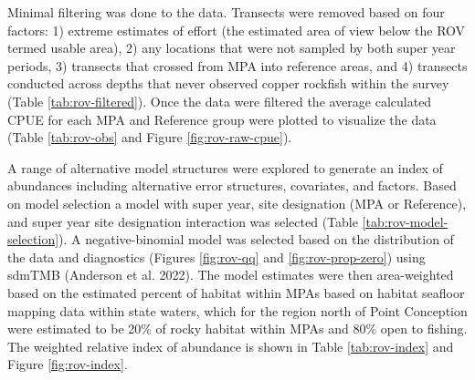 \documentclass[11pt,
  english,
  letterpaper,
]{article}
\begin{document}
Minimal filtering was done to the data. Transects were removed based on four factors: 1) extreme estimates of effort (the estimated area of view below the ROV termed usable area), 2) any locations that were not sampled by both super year periods, 3) transects that crossed from MPA into reference areas, and 4) transects conducted across depths that never observed copper rockfish within the survey (Table \ref{tab:rov-filtered}). Once the data were filtered the average calculated CPUE for each MPA and Reference group were plotted to visualize the data (Table \ref{tab:rov-obs} and Figure \ref{fig:rov-raw-cpue}).

A range of alternative model structures were explored to generate an index of abundances including alternative error structures, covariates, and factors. Based on model selection a model with super year, site designation (MPA or Reference), and super year site designation interaction was selected (Table \ref{tab:rov-model-selection}). A negative-binomial model was selected based on the distribution of the data and diagnostics (Figures \ref{fig:rov-qq} and \ref{fig:rov-prop-zero}) using sdmTMB (Anderson et al. 2022). The model estimates were then area-weighted based on the estimated percent of habitat within MPAs based on habitat seafloor mapping data within state waters, which for the region north of Point Conception were estimated to be 20\% of rocky habitat within MPAs and 80\% open to fishing. The weighted relative index of abundance is shown in Table \ref{tab:rov-index} and Figure \ref{fig:rov-index}.

\newpage



\newpage



\newpage

\begingroup\fontsize{7}{9}\selectfont
\end{document}
